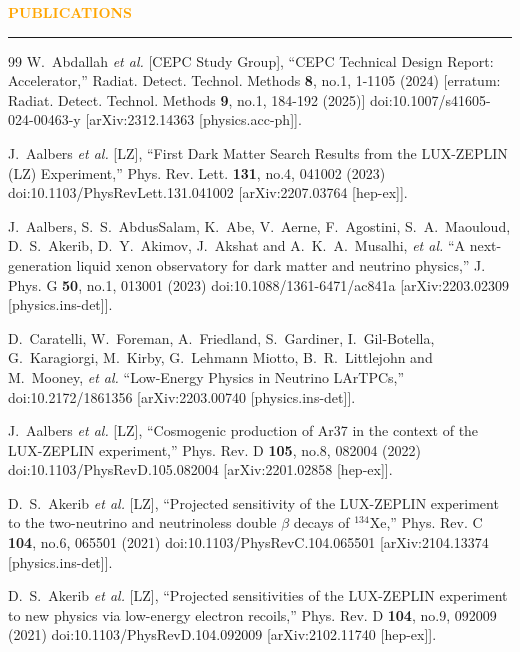 \documentclass{resume} %
\renewenvironment{rSection}[1]{
\sectionskip
\textcolor{Orange}{\bfseries\MakeUppercase{#1}}
\sectionlineskip
\hrule
\begin{list}{}{
\setlength{\leftmargin}{1.5em}
}
\item[]
}{
\end{list}
}
\begin{document}
\begin{rSection}{ Publications}
\begin{thebibliography}{99}
W.~Abdallah \textit{et al.} [CEPC Study Group],
``CEPC Technical Design Report: Accelerator,''
Radiat. Detect. Technol. Methods \textbf{8}, no.1, 1-1105 (2024)
[erratum: Radiat. Detect. Technol. Methods \textbf{9}, no.1, 184-192 (2025)]
doi:10.1007/s41605-024-00463-y
[arXiv:2312.14363 [physics.acc-ph]].

J.~Aalbers \textit{et al.} [LZ],
``First Dark Matter Search Results from the LUX-ZEPLIN (LZ) Experiment,''
Phys. Rev. Lett. \textbf{131}, no.4, 041002 (2023)
doi:10.1103/PhysRevLett.131.041002
[arXiv:2207.03764 [hep-ex]].

J.~Aalbers, S.~S.~AbdusSalam, K.~Abe, V.~Aerne, F.~Agostini, S.~A.~Maouloud, D.~S.~Akerib, D.~Y.~Akimov, J.~Akshat and A.~K.~A.~Musalhi, \textit{et al.}
``A next-generation liquid xenon observatory for dark matter and neutrino physics,''
J. Phys. G \textbf{50}, no.1, 013001 (2023)
doi:10.1088/1361-6471/ac841a
[arXiv:2203.02309 [physics.ins-det]].

D.~Caratelli, W.~Foreman, A.~Friedland, S.~Gardiner, I.~Gil-Botella, G.~Karagiorgi, M.~Kirby, G.~Lehmann Miotto, B.~R.~Littlejohn and M.~Mooney, \textit{et al.}
``Low-Energy Physics in Neutrino LArTPCs,''
doi:10.2172/1861356
[arXiv:2203.00740 [physics.ins-det]].

J.~Aalbers \textit{et al.} [LZ],
``Cosmogenic production of Ar37 in the context of the LUX-ZEPLIN experiment,''
Phys. Rev. D \textbf{105}, no.8, 082004 (2022)
doi:10.1103/PhysRevD.105.082004
[arXiv:2201.02858 [hep-ex]].

D.~S.~Akerib \textit{et al.} [LZ],
``Projected sensitivity of the LUX-ZEPLIN experiment to the two-neutrino and neutrinoless double $\beta$ decays of $^{134}$Xe,''
Phys. Rev. C \textbf{104}, no.6, 065501 (2021)
doi:10.1103/PhysRevC.104.065501
[arXiv:2104.13374 [physics.ins-det]].

D.~S.~Akerib \textit{et al.} [LZ],
``Projected sensitivities of the LUX-ZEPLIN experiment to new physics via low-energy electron recoils,''
Phys. Rev. D \textbf{104}, no.9, 092009 (2021)
doi:10.1103/PhysRevD.104.092009
[arXiv:2102.11740 [hep-ex]].


\end{thebibliography}
\end{rSection}
\end{document}
